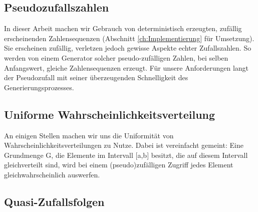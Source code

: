 \subsection{Pseudozufallszahlen}
\label{ch:Content1:sec:Pseudozufallszahlen}
In dieser Arbeit machen wir Gebrauch von deterministisch erzeugten, zufällig erscheinenden Zahlensequenzen (Abschnitt \ref{ch:Implementierung} für Umsetzung).
Sie erscheinen zufällig, verletzen jedoch gewisse Aspekte echter Zufallszahlen. So werden von einem Generator solcher pseudo-zufälligen Zahlen, bei selben 
Anfangswert, gleiche Zahlensequenzen erzeugt. Für unsere Anforderungen langt der Pseudozufall mit seiner überzeugenden Schnelligkeit des Generierungsprozesses.

\subsection{Uniforme Wahrscheinlichkeitsverteilung}
An einigen Stellen machen wir uns die Uniformität von Wahrscheinlichkeitsverteilungen zu Nutze.
Dabei ist vereinfacht gemeint: Eine Grundmenge G, die Elemente
im Intervall [a,b] besitzt, die auf diesem Intervall gleichverteilt sind,
wird bei einem (pseudo)zufälligen Zugriff jedes Element gleichwahrscheinlich auswerfen.

\subsection{Quasi-Zufallsfolgen}
\label{ch:Content1:sec:Quasi-Zufallsfolgen}

